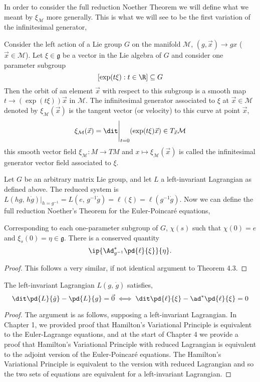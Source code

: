 \noindent
In order to consider the full reduction Noether Theorem we will define what we meant by $\xi_\mathcal{M}$ more generally. This is what we will see to be the first variation of the infinitesimal generator,
\begin{ndefi}
  Consider the left action of a Lie group $G$ on the manifold $\mathcal{M}$, $(g, \vec x) \to gx$ ($\vec x \in \mathcal{M}$). Let $\xi \in \mathfrak{g}$ be a vector in the Lie algebra of $G$ and consider one parameter subgroup $$[\exp(t\xi) : t \in \R] \subseteq G$$
  Then the orbit of an element $\vec x$ with respect to this subgroup is a smooth map $t \to (\exp(t\xi))\vec x$ in $\mathcal{M}$. The infinitesimal generator associated to $\xi$ at $\vec x \in \mathcal{M}$ denoted by $\xi_{\mathcal{M}}(\vec x)$ is the tangent vector (or velocity) to this curve at point $\vec x$,
  $$ \xi_{\mathcal{M}} (\vec x) = \dit\Bigg|_{t=0} (\exp(t \xi)\vec x) \in T_{\vec x}\mathcal{M} $$
  this smooth vector field $\xi_{\mathcal{M}} : M \to TM$ and $x \mapsto \xi_{\mathcal{M}}(\vec x)$ is called the infinitesimal generator vector field associated to $\xi$.
\end{ndefi}

Let $G$ be an arbitrary matrix Lie group, and let $L$ a left-invariant Lagrangian as defined above. The reduced system is $L(hg,\, h\dot g)|_{h = g^{-1}} = L(e,\,g^{-1}\dot g) = \ell(\xi) = \ell(g^{-1}\dot g)$. Now we can define the full reduction Noether's Theorem for the Euler-Poincar\'e equations,
\begin{nthm}
  Corresponding to each one-parameter subgroup of $G$, $\chi(s)$ such that $\chi(0) = e$ and $\xi_s(0) = \eta \in \mathfrak{g}$. There is a conserved quantity
  $$ \ip{\Ad^*_{g^{-1}} \pd{\ell}{\xi}}{\eta}. $$
\end{nthm}
\begin{proof}
  This follows a very similar, if not identical argument to Theorem 4.3.
\end{proof}

\begin{nprop}
  The left-invariant Lagrangian $L(g,\,\dot g)$ satisfies,
  $$ \dit\pd{L}{\dot g} - \pd{L}{g} = \vec 0  \iff \dit\pd{\ell}{\xi} - \ad^*\pd{\ell}{\xi} = 0$$
\end{nprop}
\begin{proof}
  The argument is as follows, supposing a left-invariant Lagrangian. In Chapter 1, we provided proof that Hamilton's Variational Principle is equivalent to the Euler-Lagrange equations, and at the start of Chapter 4 we provide a proof that Hamilton's Variational Principle with reduced Lagrangian is equivalent to the adjoint version of the Euler-Poincar\'e equations. The Hamilton's Variational Principle is equivalent to the version with reduced Lagrangian and so the two sets of equations are equivalent for a left-invariant Lagrangian.
\end{proof}

